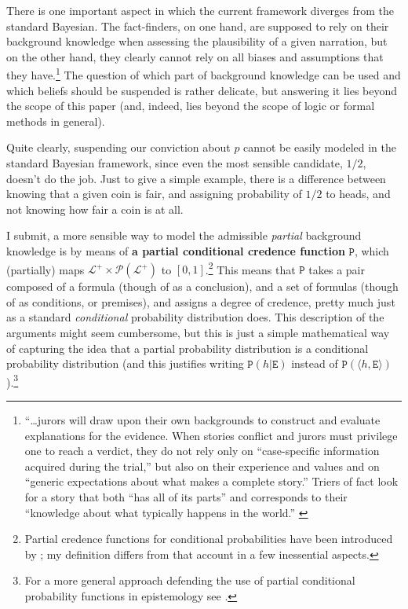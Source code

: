 \documentclass[10pt,leqno]{article}
\newcommand{\la}{\langle}
\newcommand{\ra}{\rangle}
\newcommand{\pr}[1]{\mbox{$\mathtt{P}(#1)$}}
\begin{document}
There is one important aspect in which the current framework diverges from the standard Bayesian.  The fact-finders, on one hand, are supposed to rely on their background knowledge when assessing the plausibility of a given narration, but on the other hand, they  clearly cannot rely on all biases and assumptions that they have.\footnote{
 ``\dots jurors will draw upon their own backgrounds to construct and evaluate explanations for the evidence.  When stories conflict and jurors must privilege one to reach a verdict, they do not rely only on ``case-specific information acquired during the trial,'' but also on their experience and values and on ``generic expectations about what makes a complete story.'' Triers of fact look for a story that both ``has all of its parts'' and corresponds to their ``knowledge about what typically happens in the world.''   \citep[294]{griffin2012narrative}} The question of which part of background knowledge can be used and which beliefs should be suspended is rather delicate, but answering it lies beyond the scope of this paper (and, indeed, lies beyond the scope of logic or formal methods in general).  
 
 Quite clearly, suspending our conviction about $p$ cannot be easily modeled in the standard Bayesian framework, since even the most sensible candidate, $1/2$, doesn't do the job. Just to give a simple example, there is a difference between knowing that a given coin is fair, and assigning probability of $1/2$ to heads, and not knowing how fair a coin is at all. 
 
 I submit, a more sensible way to model the admissible \emph{partial} background knowledge is by means of  \textbf{a partial conditional credence function} $\mathtt{P}$, which (partially) maps  $\mathcal{L^+}\times \mathcal{P}(\mathcal{L^+})$ to  $[0,1]$.\footnote{Partial credence functions for conditional probabilities have been introduced by \citep{lepage2003probabilistic,lepage2012partial}; my definition differs from that account in a few inessential aspects.} This means that $\mathtt{P}$ takes a pair composed of a formula (though of as a conclusion), and a set of formulas (though of as conditions, or premises), and assigns a degree of credence, pretty much just as a standard \emph{conditional} probability distribution does. This description of the arguments might seem cumbersome, but this is just a simple mathematical way of capturing the idea  that a partial probability distribution is  a conditional probability distribution (and this justifies writing $\pr{h\vert \mathtt{E}}$ instead of $\pr{\la h, \mathtt{E}\ra}$).\footnote{For a more general approach defending the use of partial conditional probability functions in epistemology see \citep{van1995fine}.}    
 
\end{document}
